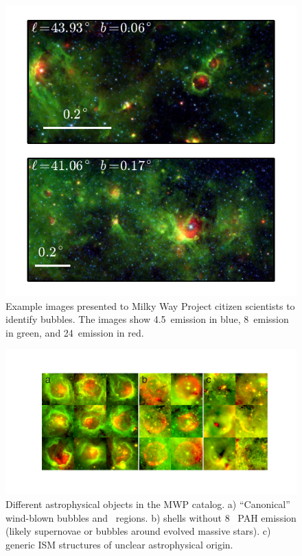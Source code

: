 \begin{figure}[h!]
\includegraphics{mwp}
\caption{Example images presented to Milky Way Project citizen scientists to identify bubbles. The images show 4.5\um\, emission in blue,  8\um\, emission in green, and 24\um\, emission in red.}
\label{fig:mwp}
\end{figure}

\begin{figure}
\includegraphics[trim= .7in 0 0 0, clip]{gallery}
\caption{Different astrophysical objects in the MWP catalog. a) ``Canonical'' wind-blown bubbles and \hii\, regions. b) shells
without 8 \um\, PAH emission (likely supernovae or bubbles around evolved massive stars). c) generic ISM structures of unclear astrophysical origin.}
\label{fig:gallery}
\end{figure}


